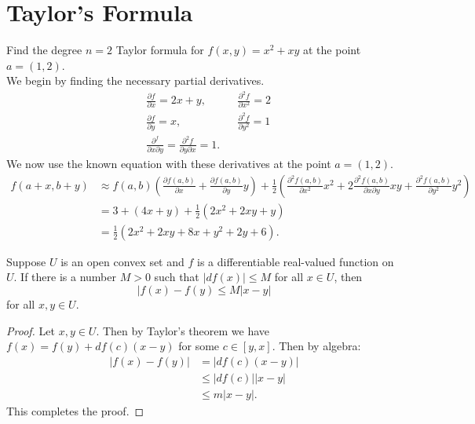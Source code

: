 \documentclass[12pt]{book}
\newenvironment{exercise}[2][Exercise]{\begin{trivlist}
\item[\hskip \labelsep {\bfseries #1}\hskip \labelsep {\bfseries #2.}]}{\end{trivlist}}
\begin{document}
\section{Taylor's Formula}


\begin{exercise}{9.5.1}
    Find the degree $n =2$ Taylor formula for $f(x,y)=x^2 + x y$ at the point $a=(1,2)$.  \\
    
    We begin by finding the necessary partial derivatives.
    \begin{align*}
        &\frac{\partial f}{\partial x} = 2x+y, &&\frac{\partial^2 f}{\partial x^2} = 2 \\
        &\frac{\partial f}{\partial y} = x,    &&\frac{\partial^2 f}{\partial y^2} = 1 \\
        &\frac{\partial^f}{\partial x \partial y} = \frac{\partial^2 f}{\partial y \partial x} = 1.
    \end{align*}
    We now use the known equation with these derivatives at the point $a=(1,2)$.
    \begin{align*}
        f(a+x, b+y) &\approx f(a,b) \left( \frac{\partial f(a,b)}{\partial x} + \frac{\partial f(a,b)}{\partial y} y \right) + \frac{1}{2} \left( \frac{\partial^2 f(a,b)}{\partial x^2} x^2 + 2 \frac{\partial^2 f(a,b)}{\partial x \partial y} x y + \frac{\partial^2 f(a,b)}{\partial y^2} y^2 \right)  \\
                    &= 3 + \left(4x+y\right) + \frac{1}{2} \left( 2 x^2 + 2 xy + y \right)  \\
                    &= \frac{1}{2} \left( 2x^2 + 2xy+ 8x+y^2 + 2 y + 6\right).
    \end{align*}
\end{exercise}

\begin{exercise}{9.5.4}
    Suppose $U$ is an open convex set and $f$ is a differentiable real-valued function on $U$. If there is a number $M > 0$ such that $|df(x)| \leq M$ for all $x\in U$, then 
        \[ |f(x) - f(y) \leq M |x-y| \]
    for all $x,y \in U$.

    \begin{proof}
        Let $x,y \in U$. Then by Taylor's theorem we have $f(x) = f(y) + df(c) (x-y)$ for some $c \in [y,x]$. Then by algebra:
        \begin{align*}
            |f(x) - f(y) | &= |df(c)(x-y)| \\
                           &\leq |df(c)| |x-y| \\
                           &\leq m | x-y|.
        \end{align*}
        This completes the proof.
    \end{proof}
\end{exercise}
\end{document}
